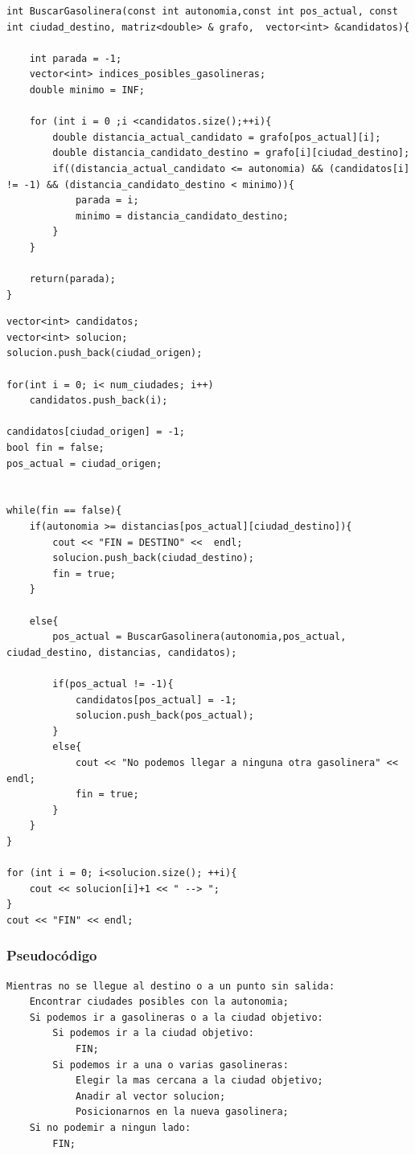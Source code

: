 \documentclass[11pt,a4paper]{article} %
\begin{document}
\begin{lstlisting}[style=C++]
int BuscarGasolinera(const int autonomia,const int pos_actual, const int ciudad_destino, matriz<double> & grafo,  vector<int> &candidatos){

	int parada = -1;
	vector<int> indices_posibles_gasolineras;
	double minimo = INF;
	
	for (int i = 0 ;i <candidatos.size();++i){
		double distancia_actual_candidato = grafo[pos_actual][i];
		double distancia_candidato_destino = grafo[i][ciudad_destino];
		if((distancia_actual_candidato <= autonomia) && (candidatos[i] != -1) && (distancia_candidato_destino < minimo)){
			parada = i;
			minimo = distancia_candidato_destino;
		}
	}
	
	return(parada);
}
\end{lstlisting}

\begin{lstlisting}[style=C++]
vector<int> candidatos;
vector<int> solucion;
solucion.push_back(ciudad_origen);

for(int i = 0; i< num_ciudades; i++)
	candidatos.push_back(i);

candidatos[ciudad_origen] = -1;
bool fin = false;
pos_actual = ciudad_origen;


while(fin == false){
	if(autonomia >= distancias[pos_actual][ciudad_destino]){
		cout << "FIN = DESTINO" <<  endl;
		solucion.push_back(ciudad_destino);
		fin = true;
	}

	else{
		pos_actual = BuscarGasolinera(autonomia,pos_actual, ciudad_destino, distancias, candidatos);
	
		if(pos_actual != -1){
			candidatos[pos_actual] = -1;
			solucion.push_back(pos_actual);
		}
		else{
			cout << "No podemos llegar a ninguna otra gasolinera" << endl;
			fin = true;
		}
	}
}

for (int i = 0; i<solucion.size(); ++i){
	cout << solucion[i]+1 << " --> ";
}
cout << "FIN" << endl;
\end{lstlisting}

\subsubsection{Pseudocódigo}

\begin{lstlisting}
Mientras no se llegue al destino o a un punto sin salida:
	Encontrar ciudades posibles con la autonomia;
	Si podemos ir a gasolineras o a la ciudad objetivo:
		Si podemos ir a la ciudad objetivo:
			FIN;
		Si podemos ir a una o varias gasolineras:
			Elegir la mas cercana a la ciudad objetivo;
			Anadir al vector solucion;
			Posicionarnos en la nueva gasolinera;
	Si no podemir a ningun lado:
		FIN;
\end{lstlisting}
\end{document}
